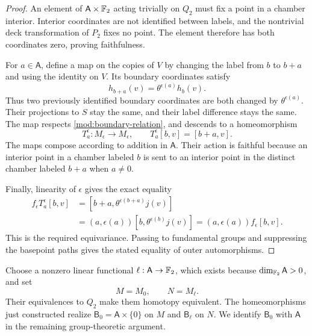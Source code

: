 \begin{proof}
An element of \(\mathsf A\times\mathbb F_2\) acting trivially on \(Q_2\)
must fix a point in a chamber interior.  Interior coordinates are
not identified between labels, and the nontrivial deck transformation
of \(P_2\) fixes no point.  The element therefore has both coordinates
zero, proving faithfulness.

For \(a\in\mathsf A\), define a map on the copies of \(V\) by changing
the label from \(b\) to \(b+a\) and using the identity on \(V\).
Its boundary coordinates satisfy
\[
 h_{b+a}(v)=\theta^{\epsilon(a)}h_b(v).
\]
Thus two previously identified boundary coordinates are both changed
by \(\theta^{\epsilon(a)}\).  Their projections to \(S\) stay the
same, and their label difference stays the same.  The map respects
\eqref{mod:boundary-relation}, and descends to a homeomorphism
\[
 T^\epsilon_a:M_\epsilon\longrightarrow M_\epsilon,\qquad
 T^\epsilon_a[b,v]=[b+a,v].
\]
The maps compose according to addition in \(\mathsf A\).  Their
action is faithful because an interior point in a chamber labeled
\(b\) is sent to an interior point in the distinct chamber labeled
\(b+a\) when \(a\ne0\).

Finally, linearity of \(\epsilon\) gives the exact equality
\[
 \begin{split}
 f_\epsilon T^\epsilon_a[b,v]
    &=[b+a,\theta^{\epsilon(b+a)}j(v)]\\
    &=(a,\epsilon(a))[b,\theta^{\epsilon(b)}j(v)]
      =(a,\epsilon(a))f_\epsilon[b,v].
 \end{split}
\]
This is the required equivariance.  Passing to fundamental groups
and suppressing the basepoint paths gives the stated equality of
outer automorphisms.
\end{proof}

Choose a nonzero linear functional \(\ell:\mathsf A\to\mathbb F_2\), which
exists because \(\dim_{\mathbb F_2}\mathsf A>0\), and set
\begin{equation}\label{mod:two-models}
 M=M_0,\qquad N=M_\ell.
\end{equation}
Their equivalences to \(Q_2\) make them homotopy equivalent.  The
homeomorphisms just constructed realize
\(\mathsf B_0=\mathsf A\times\{0\}\) on \(M\) and
\(\mathsf B_\ell\) on \(N\).  We identify \(\mathsf B_0\) with
\(\mathsf A\) in the remaining group-theoretic argument.
